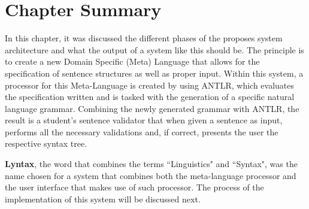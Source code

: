 \section{Chapter Summary}

In this chapter, it was discussed the different phases of the proposes system architecture and what the output of a system like this should be.
The principle is to create a new Domain Specific (Meta) Language that allows for the specification of sentence structures as well as proper input.
Within this system, a processor for this Meta-Language is created by using \textsc{ANTLR},
which evaluates the specification written and is tasked with the generation of a specific natural language grammar.
Combining the newly generated grammar with \textsc{ANTLR}, the result is a student's sentence validator
that when given a sentence as input, performs all the necessary validations and, if correct, presents the user the respective syntax tree.

\textbf{Lyntax}, the word that combines the terms ``Linguistics" and ``Syntax", was the name chosen for a system that combines both the meta-language processor and
the user interface that makes use of such processor. The process of the implementation of this system will be discussed next.
